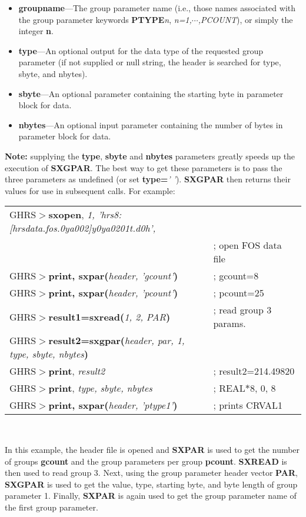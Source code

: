 \begin{description}
\begin{itemize}
\item {\bf groupname}---The group parameter name (i.e., those names 
associated with the group parameter keywords {\bf PTYPE}{\it n}, 
{\it n=1,$\cdots$,PCOUNT}), or simply the integer {\bf n}.

\item {\bf type}---An optional output for the 
data type of the requested group parameter (if not supplied or null string, 
the header is searched for type, sbyte, and nbytes).

\item {\bf sbyte}---An optional parameter containing the starting byte 
in parameter block for data.
\newpage

\item {\bf nbytes}---An 
optional input parameter containing the 
number of bytes in parameter block for data.
\end{itemize}

{\bf Note:} supplying the {\bf type}, {\bf sbyte} and {\bf nbytes} parameters 
greatly speeds up the execution of {\bf SXGPAR}.  The best way to get 
these parameters is to pass the three parameters as undefined 
(or set {\bf type=}{\it ' '}).  {\bf SXGPAR} then returns their values for 
use in subsequent calls.  For example:\\

\begin{small}
\begin{tabular}{ll}
GHRS$>${\bf sxopen}, {\it 1, 'hrs8:[hrsdata.fos.0ya002]y0ya0201t.d0h',} & \\
\hspace{1.1in}{\it  header} & ; open FOS data file\\
GHRS$>${\bf print, sxpar(}{\it header, 'gcount'}{\bf )} & ; gcount=8 \\
GHRS$>${\bf print, sxpar(}{\it header, 'pcount'}{\bf )} & ; pcount=25\\
GHRS$>${\bf result1=sxread(}{\it 1, 2, PAR}{\bf )} & ; read group 3 params.\\
GHRS$>${\bf result2=sxgpar(}{\it header, par, 1, type, sbyte, nbytes}{\bf )} & \\
GHRS$>${\bf print}, {\it result2} & ; result2=214.49820 \\
GHRS$>${\bf print}, {\it type, sbyte, nbytes} & ; REAL$*$8, 0, 8\\
GHRS$>${\bf print, sxpar(}{\it header, 'ptype1'}{\bf )} & ; prints CRVAL1\\
\end{tabular}\\
\end{small}

\noindent
In this example, the header file is opened and {\bf SXPAR} is used to get the
number of groups {\bf gcount} and the group parameters per group {\bf pcount}.  
{\bf SXREAD} is then used to read group 3.  Next, using the group 
parameter header vector {\bf PAR}, {\bf SXGPAR} is used to get the value, 
type, starting byte, and byte length of group parameter 1.  Finally, 
{\bf SXPAR} is again used to get the group parameter name of the first 
group parameter.
\end{description}


